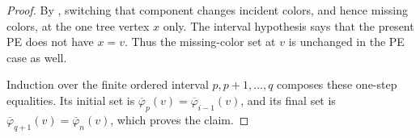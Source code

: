 \begin{proof}
By , switching that component changes
incident colors, and hence missing colors, at the one tree vertex \(x\)
only.  The interval hypothesis says that the present PE does not have
\(x=v\).  Thus the missing-color set at \(v\) is unchanged in the PE case
as well.

Induction over the finite ordered interval \(p,p+1,\ldots,q\) composes
these one-step equalities.  Its initial set is
\(\overline\varphi_p(v)=\overline\varphi_{i-1}(v)\), and its final set is
\(\overline\varphi_{q+1}(v)=\overline\varphi_n(v)\), which proves the
claim.
\end{proof}
